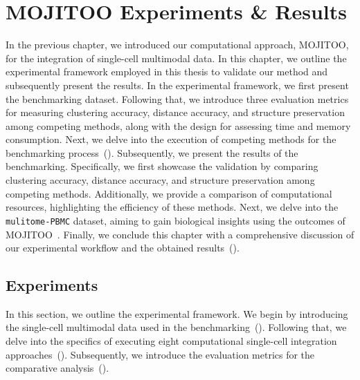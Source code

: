 %
\chapter{MOJITOO Experiments \& Results }
\label{chapter:MOJITOO_bench}

\graphicspath{{chapter5/figs}}
In the previous chapter, we introduced our computational approach, MOJITOO, for the integration of single-cell multimodal data. In this chapter, we outline the experimental framework employed in this thesis to validate our method and subsequently present the results. In the experimental framework, we first present the benchmarking dataset. Following that, we introduce three evaluation metrics for measuring clustering accuracy, distance accuracy, and structure preservation among competing methods, along with the design for assessing time and memory consumption. Next, we delve into the execution of competing methods for the benchmarking process~(). Subsequently, we present the results of the benchmarking. Specifically, we first showcase the validation by comparing clustering accuracy, distance accuracy, and structure preservation among competing methods. Additionally, we provide a comparison of computational resources, highlighting the efficiency of these methods. Next, we delve into the \texttt{mulitome-PBMC} dataset, aiming to gain biological insights using the outcomes of MOJITOO~. Finally, we conclude this chapter with a comprehensive discussion of our experimental workflow and the obtained results~().


\section{Experiments}
\label{MOJITOO:exp}
In this section, we outline the experimental framework. We begin by introducing the single-cell multimodal data used in the benchmarking~(). Following that, we delve into the specifics of executing eight computational single-cell integration approaches~(). Subsequently, we introduce the evaluation metrics for the comparative analysis~().

